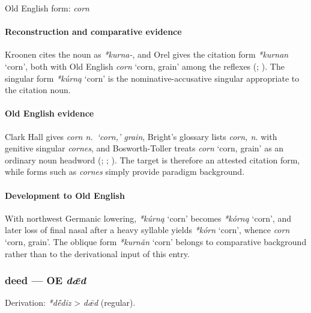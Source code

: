 \documentclass[
  british,
  a4paper,
]{article}
\providecommand{\Recon}[1]{\emph{*#1}}
\begin{document}
Old English form: \emph{corn}

\paragraph{Reconstruction and comparative
evidence}\label{reconstruction-and-comparative-evidence-12}

Kroonen cites the noun as \emph{*kurna-}, and Orel gives the citation
form \Recon{kurnan} `corn', both with Old English {\emph{corn}} `corn,
grain' among the reflexes (;
). The singular form
\Recon{kúrną} `corn' is the nominative-accusative singular appropriate
to the citation noun.

\paragraph{Old English evidence}\label{old-english-evidence-12}

Clark Hall gives \emph{corn n.~`corn,' grain}, Bright's glossary lists
\emph{corn, n.} with genitive singular \emph{cornes}, and
Bosworth-Toller treats {\emph{corn}} `corn, grain' as an ordinary noun
headword (;
;
). The
target is therefore an attested citation form, while forms such as
\emph{cornes} simply provide paradigm background.

\paragraph{Development to Old
English}\label{development-to-old-english-12}

With northwest Germanic lowering, \Recon{kúrną} `corn' becomes
\Recon{kórną} `corn', and later loss of final nasal after a heavy
syllable yields \Recon{kórn} `corn', whence {\emph{corn}} `corn, grain'.
The oblique form \Recon{kurnăn} `corn' belongs to comparative background
rather than to the derivational input of this entry.

\subsubsection{\texorpdfstring{deed --- OE
\emph{dǣd}}{deed --- OE dǣd}}\label{deed-oe-dux1e3d}

Derivation: \emph{*dḗdiz} \textgreater{} \emph{dǣd} (regular).
\end{document}
